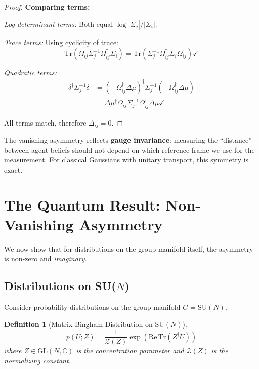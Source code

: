 \documentclass[11pt,a4paper]{article}
\newtheorem{definition}[theorem]{Definition}
\newcommand{\Tr}{\mathrm{Tr}}
\newcommand{\SUN}{\mathrm{SU}(N)}
\newcommand{\C}{\mathbb{C}}
\begin{document}
\begin{proof}
\textbf{Comparing terms:}

\emph{Log-determinant terms:} Both equal $\log|\Sigma_j|/|\Sigma_i|$. \checkmark

\emph{Trace terms:} Using cyclicity of trace:
\begin{equation}
    \Tr(\Omega_{ij}\Sigma_j^{-1}\Omega_{ij}^\dagger \Sigma_i) = \Tr(\Sigma_j^{-1}\Omega_{ij}^\dagger \Sigma_i \Omega_{ij}) \checkmark
\end{equation}

\emph{Quadratic terms:}
\begin{align}
    \delta^\dagger \Sigma_j^{-1} \delta &= (-\Omega_{ij}^\dagger \Delta\mu)^\dagger \Sigma_j^{-1} (-\Omega_{ij}^\dagger \Delta\mu) \\
    &= \Delta\mu^\dagger \Omega_{ij} \Sigma_j^{-1} \Omega_{ij}^\dagger \Delta\mu \checkmark
\end{align}

All terms match, therefore $\Delta_{ij} = 0$.
\end{proof}

\begin{physicalinsight}
The vanishing asymmetry reflects \textbf{gauge invariance}: measuring the ``distance'' between agent beliefs should not depend on which reference frame we use for the measurement. For classical Gaussians with unitary transport, this symmetry is exact.
\end{physicalinsight}

\section{The Quantum Result: Non-Vanishing Asymmetry}

We now show that for distributions on the group manifold itself, the asymmetry is non-zero and \emph{imaginary}.

\subsection{Distributions on SU($N$)}

Consider probability distributions on the group manifold $G = \SUN$.

\begin{definition}[Matrix Bingham Distribution on $\SUN$]
\begin{equation}
    p(U; Z) = \frac{1}{\mathcal{Z}(Z)} \exp\left(\mathrm{Re}\,\Tr(Z^\dagger U)\right)
\end{equation}
where $Z \in \mathrm{GL}(N, \C)$ is the concentration parameter and $\mathcal{Z}(Z)$ is the normalizing constant.
\end{definition}
\end{document}
